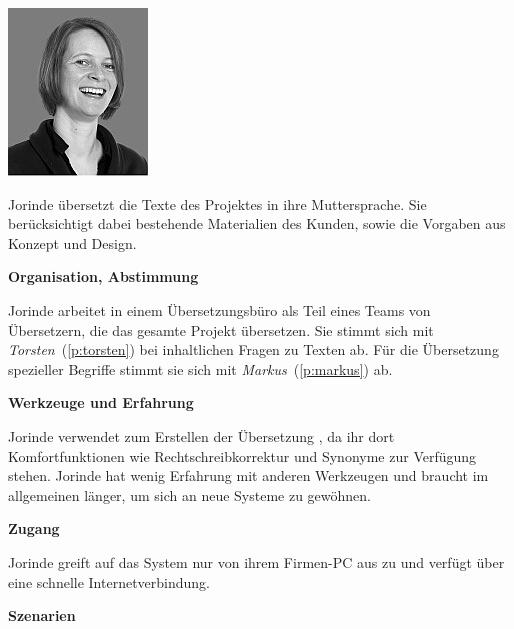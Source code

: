 \begin{multicols}{2}

\begin{center}
\includegraphics[width=0.5\columnwidth]{media/jorinde.jpg}
\end{center}


Jorinde übersetzt die Texte des Projektes in ihre Muttersprache. Sie berücksichtigt dabei bestehende Materialien des Kunden, sowie die Vorgaben aus Konzept und Design.

\textbf{Organisation, Abstimmung}

Jorinde arbeitet in einem Übersetzungsbüro als Teil eines Teams von Übersetzern, die das gesamte Projekt übersetzen. Sie stimmt sich mit \emph{Torsten}~(\ref{p:torsten}) bei inhaltlichen Fragen zu Texten ab. Für die Übersetzung spezieller Begriffe stimmt sie sich mit \emph{Markus}~(\ref{p:markus}) ab.

\textbf{Werkzeuge und Erfahrung}

Jorinde verwendet zum Erstellen der Übersetzung , da ihr dort Komfortfunktionen wie Rechtschreibkorrektur und Synonyme zur Verfügung stehen.  Jorinde hat wenig Erfahrung mit anderen Werkzeugen und braucht im allgemeinen länger, um sich an neue Systeme zu gewöhnen.

\textbf{Zugang}

Jorinde greift auf das System nur von ihrem Firmen-PC aus zu und verfügt über eine schnelle Internetverbindung.

\columnbreak

\textbf{Szenarien}


\end{multicols}
